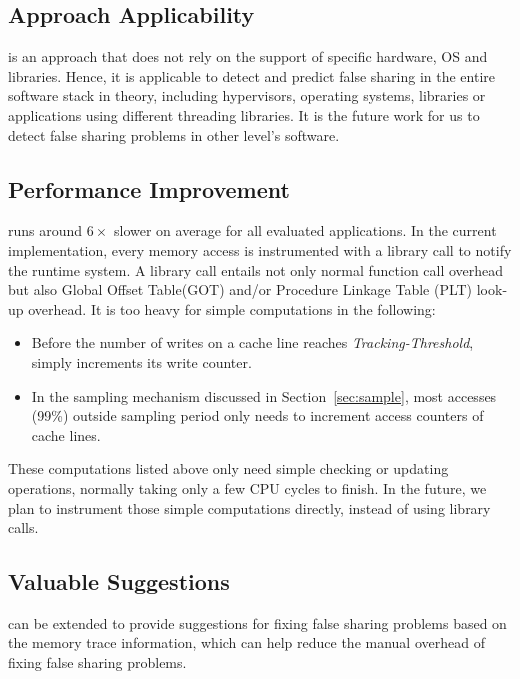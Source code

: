 \label{sec:futurework}

\subsection{Approach Applicability}
\Predator{} is an approach that does not rely on the support of specific hardware, OS and libraries.
Hence, it is applicable to detect and predict false sharing in the entire software stack in theory, including hypervisors, operating systems, libraries or applications using different threading libraries. It is the future work for us to detect false sharing problems in other level's software.


\subsection{Performance Improvement}
\Predator{} runs around $6\times$ slower on average for all evaluated applications. In the current implementation, every memory access is instrumented with a library call to notify the runtime system. A library call entails not only normal function call overhead but also Global Offset Table(GOT) and/or Procedure Linkage Table (PLT) look-up overhead. 
It is too heavy for simple computations in the following:

\begin{itemize}
\item
Before the number of writes on a cache line reaches {\it Tracking-Threshold},  \Predator{} simply increments its write counter.

\item
In the sampling mechanism discussed in Section~\ref{sec:sample}, most accesses (99\%) outside sampling period only needs to increment access counters of cache lines.
\end{itemize}

These computations listed above only need simple checking or updating operations, normally taking only a few CPU cycles to finish. 
In the future, we plan to instrument those simple computations directly, instead of using library calls.

\subsection{Valuable Suggestions}
\Predator{} can be extended to provide suggestions for fixing false sharing problems based on the memory trace information, which can help reduce the manual overhead of fixing false sharing problems.  
